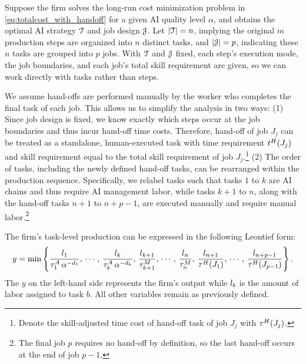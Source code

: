 Suppose the firm solves the long-run cost minimization problem in \eqref{eq:totalcost_with_handoff} for a given AI quality level $\alpha$, and obtains the optimal AI strategy \( \mathcal{T} \) and job design \( \mathcal{J} \).
Let \( |\mathcal{T}| = n \), implying the original \( m \) production steps are organized into \( n \) distinct tasks, and \( |\mathcal{J}| = p \), indicating these \( n \) tasks are grouped into \( p \) jobs.
With $\mathcal{T}$ and $\mathcal{J}$ fixed, each step's execution mode, the job boundaries, and each job's total skill requirement are given, so we can work directly with tasks rather than steps.

We assume hand-offs are performed manually by the worker who completes the final task of each job.
This allows us to simplify the analysis in two ways:
(1) Since job design is fixed, we know exactly which steps occur at the job boundaries and thus incur hand-off time costs. Therefore, hand-off of job $J_j$ can be treated as a standalone, human-executed task with time requirement \( t^{H}_{}(J_j) \) and skill requirement equal to the total skill requirement of job $J_j$.\footnote{
Denote the skill-adjusted time cost of hand-off task of job $J_j$ with $\tau^{H}_{}(J_j)$.
}
(2) The order of tasks, including the newly defined hand-off tasks, can be rearranged within the production sequence.
Specifically, we relabel tasks such that tasks \( 1 \) to \( k \) are AI chains and thus require AI management labor, while tasks \( k+1 \) to \( n \), along with the hand-off tasks \( n+1 \) to \( n+p-1 \), are executed manually and require manual labor.\footnote{
The final job \( p \) requires no hand-off by definition, so the last hand-off occurs at the end of job \( p-1 \).
}

The firm's task-level production can be expressed in the following Leontief form:
\begin{equation}
y = \min\left\{\frac{l_{1}}{\tau^{A}_{1}\,\alpha^{-d_{1}}},\,\cdots,\,\frac{l_{k}}{\tau^{A}_{k}\,\alpha^{-d_{k}}},\,\frac{l_{k+1}}{\tau^{M}_{k+1}},\,\cdots,\,\frac{l_{n}}{\tau^{M}_{n}},\,\frac{l_{n+1}}{\tau^{H}_{}(J_1)},\,\cdots,\,\frac{l_{n+p-1}}{\tau^{H}_{}(J_{p-1})}\right\}.\label{eq:task_level_prod}
\end{equation}
The \( y \) on the left-hand side represents the firm's output while $l_{b}$ is the amount of labor assigned to task $b$. All other variables remain as previously defined.

